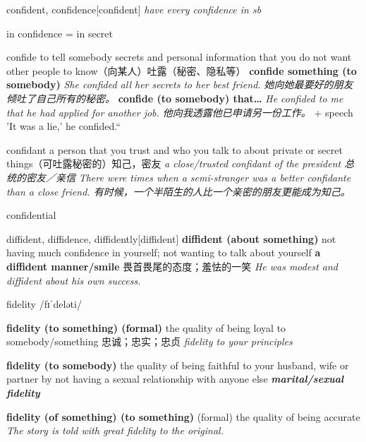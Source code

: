 \begin{DefWord}{confident, confidence}[confident]
    \textit{have every confidence in sb}

    in confidence = in secret
\end{DefWord}

\begin{DefWord}{confide}
    to tell somebody secrets and personal information that you do not want other people to know（向某人）吐露（秘密、隐私等）
    \textbf{ confide something (to somebody)} \textit{She confided all her secrets to her best friend. 她向她最要好的朋友倾吐了自己所有的秘密。}
    \textbf{confide (to somebody) that…} \textit{He confided to me that he had applied for another job. 他向我透露他已申请另一份工作。}
 + speech 'It was a lie,' he confided.“
\end{DefWord}

\begin{DefWord}{confidant}
    a person that you trust and who you talk to about private or secret things（可吐露秘密的）知己，密友
    \textit{a close/trusted confidant of the president 总统的密友／亲信}
    \textit{There were times when a semi-stranger was a better confidante than a close friend. 有时候，一个半陌生的人比一个亲密的朋友更能成为知己。}
\end{DefWord}

\begin{DefWord}{confidential}
\end{DefWord}

\begin{DefWord}{diffident, diffidence, diffidently}[diffident]
    \textbf{diffident (about something)} not having much confidence in yourself; not wanting to talk about yourself
    \textbf{a diffident manner/smile} 畏首畏尾的态度；羞怯的一笑
    \textit{He was modest and diffident about his own success.}
\end{DefWord}

\begin{DefWord}{fidelity}
    /fɪˈdeləti/

    \textbf{fidelity (to something) (formal)} the quality of being loyal to somebody/something 忠诚；忠实；忠贞
    \textit{fidelity to your principles}

    \textbf{fidelity (to somebody)} the quality of being faithful to your husband, wife or partner by not having a sexual relationship with anyone else
    \textit{\textbf{marital/sexual fidelity}}

    \textbf{fidelity (of something) (to something)} (formal) the quality of being accurate
    \textit{The story is told with great fidelity to the original.}
\end{DefWord}

